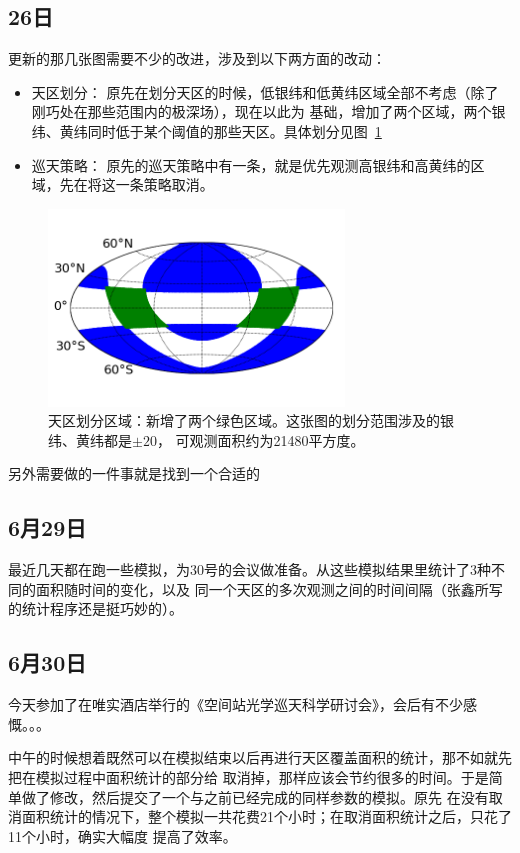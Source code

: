 \subsection{26日}
更新的那几张图需要不少的改进，涉及到以下两方面的改动：
\begin{itemize}
\item {\heiti 天区划分}：
原先在划分天区的时候，低银纬和低黄纬区域全部不考虑（除了刚巧处在那些范围内的极深场），现在以此为
基础，增加了两个区域，两个银纬、黄纬同时低于某个阈值的那些天区。具体划分见图~\ref{fig:sky_map}
\item{\heiti  巡天策略}：
原先的巡天策略中有一条，就是优先观测高银纬和高黄纬的区域，先在将这一条策略取消。
\end{itemize}

\begin{figure}
\centering
\includegraphics[width=0.7\textwidth]{figs/check_log/sky_map.png}
\caption{天区划分区域：新增了两个绿色区域。这张图的划分范围涉及的银纬、黄纬都是$\pm 20$\textdegree ，
可观测面积约为21480平方度。}
\label{fig:sky_map}
\end{figure}

另外需要做的一件事就是找到一个合适的

\subsection{6月29日}
最近几天都在跑一些模拟，为30号的会议做准备。从这些模拟结果里统计了3种不同的面积随时间的变化，以及
同一个天区的多次观测之间的时间间隔（张鑫所写的统计程序还是挺巧妙的）。

\subsection{6月30日}
今天参加了在唯实酒店举行的《空间站光学巡天科学研讨会》，会后有不少感慨。。。

中午的时候想着既然可以在模拟结束以后再进行天区覆盖面积的统计，那不如就先把在模拟过程中面积统计的部分给
取消掉，那样应该会节约很多的时间。于是简单做了修改，然后提交了一个与之前已经完成的同样参数的模拟。原先
在没有取消面积统计的情况下，整个模拟一共花费21个小时；在取消面积统计之后，只花了11个小时，确实大幅度
提高了效率。

